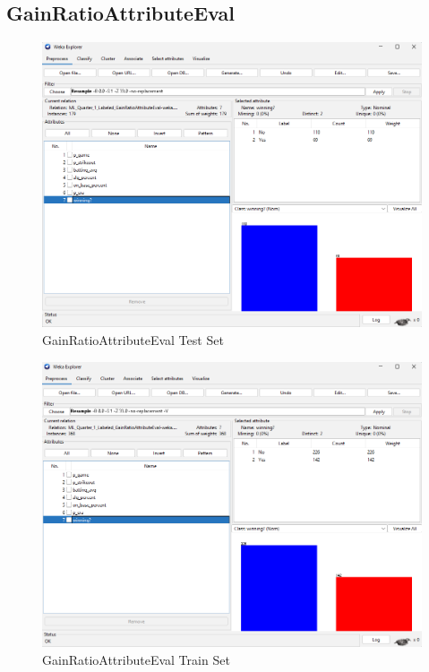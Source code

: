 \documentclass[12pt]{article}
\begin{document}
\newpage
\subsection{GainRatioAttributeEval}
\begin{figure}[h!]
    \includegraphics[scale=0.4]{./images/GainRatioAttributeEval/TestSet.png}
\centering
    \caption{GainRatioAttributeEval Test Set}
    \label{fig:GRAETest}
\end{figure}
\begin{figure}[h!]
   \includegraphics[scale=0.4]{./images/GainRatioAttributeEval/TrainSet.png}
\centering
    \caption{GainRatioAttributeEval Train Set}
    \label{fig:GRAETrain}
\end{figure}
\end{document}
